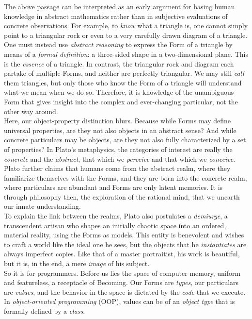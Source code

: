 The above passage can be interpreted as an early argument for basing human knowledge in abstract mathematics rather than in subjective evaluations of concrete observations. For example, to \textit{know} what a triangle is, one cannot simply point to a triangular rock or even to a very carefully drawn diagram of a triangle. One must instead use \textit{abstract reasoning} to express the Form of a triangle by means of a \textit{formal definition}: a three-sided shape in a two-dimensional plane. This is the \textit{essence} of a triangle. In contrast, the triangular rock and diagram each partake of multiple Forms, and neither are perfectly triangular. We may still \textit{call} them triangles, but only those who know the Form of a triangle will understand what we mean when we do so. Therefore, it is knowledge of the unambiguous Form that gives insight into the complex and ever-changing particular, not the other way around. \\

Here, our object-property distinction blurs. Because while Forms may define universal properties, are they not also objects in an abstract sense? And while concrete particulars may be objects, are they not also fully characterized by a set of properties? In Plato's metaphysics, the categories of interest are really the \textit{concrete} and the \textit{abstract}, that which we \textit{perceive} and that which we \textit{conceive}. Plato further claims that humans come from the abstract realm, where they familiarize themselves with the Forms, and they are born into the concrete realm, where particulars are abundant and Forms are only latent memories. It is through philosophy then, the exploration of the rational mind, that we unearth our innate understanding. \\

To explain the link between the realms, Plato also postulates a \textit{demiurge}, a transcendent artisan who shapes an initially chaotic space into an ordered, material reality, using the Forms as models. This entity is benevolent and wishes to craft a world like the ideal one he sees, but the objects that he \textit{instantiates} are always imperfect copies. Like that of a master portraitist, his work is beautiful, but it is, in the end, a mere \textit{image} of his subject. \\

So it is for programmers. Before us lies the space of computer memory, uniform and featureless, a receptacle of Becoming. Our Forms are \textit{types}, our particulars are \textit{values}, and the behavior in the space is dictated by the \textit{code} that we execute. In \textit{object-oriented programming} (OOP), values can be of an \textit{object type} that is formally defined by a \textit{class}. \\


